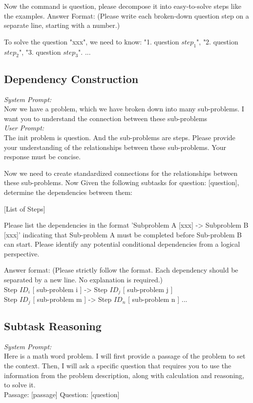 Now the command is {question}, please decompose it into easy-to-solve steps like the examples.
Answer Format: (Please write each broken-down question step on a separate line, starting with a number.)

To solve the question "xxx", we need to know:
"1. question $step_1$",
"2. question $step_2$",
"3. question $step_3$".
...

\vspace{-2mm}
\subsection{Dependency Construction}
\textit{System Prompt:}\\
Now we have a problem, which we have broken down into many sub-problems. I want you to understand the connection between these sub-problems\\
\textit{User Prompt:\\}
    The init problem is {question}. And the sub-problems are {steps}. Please provide your understanding of the relationships between these sub-problems. Your response must be concise.

    Now we need to create standardized connections for the relationships between these sub-problems.
    Now Given the following subtasks for question: [question], determine the dependencies between them:

    [List of Steps]
        
    Please list the dependencies in the format 'Subproblem A [xxx] -> Subproblem B [xxx]' indicating that Sub-problem A must be completed before Sub-problem B can start.
    Please identify any potential conditional dependencies from a logical perspective.
    
    Answer format: (Please strictly follow the format. Each dependency should be separated by a new line. No explanation is required.)\\
    Step $ID_i$ [ sub-problem i ] -> Step $ID_j$ [ sub-problem j ]\\
    Step $ID_j$ [ sub-problem m ] -> Step $ID_n$ [ sub-problem n ] ...
\vspace{-2mm}
\subsection{Subtask Reasoning}
\textit{System Prompt:}\\
Here is a math word problem. I will first provide a passage of the problem to set the context. Then, I will ask a specific question that requires you to use the information from the problem description, along with calculation and reasoning, to solve it. \\
Passage:
[passage] Question: [question]

